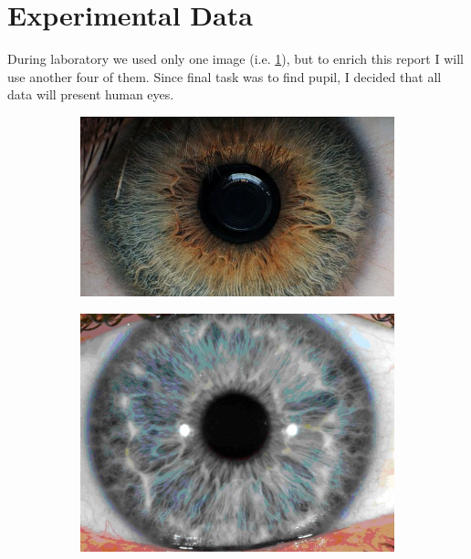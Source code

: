 \documentclass{article}
\begin{document}

\section{Experimental Data}
During laboratory we used only one image (i.e. \ref{fig:sample_1}), but to enrich this report I will use another four of them. Since final task was to find pupil, I decided that all data will present human eyes.

\begin{figure}[H]
\centering
\begin{subfigure}{.5\textwidth}
  \centering
  \includegraphics[width=0.97\linewidth]{_Figures/raw_data_1.jpg}
  \caption{}
  \label{fig:sample_1}
\end{subfigure}%
\begin{subfigure}{.5\textwidth}
  \centering
  \includegraphics[width=0.97\linewidth]{_Figures/raw_data_2.jpg}

\end{subfigure}
\end{figure}
\end{document}
